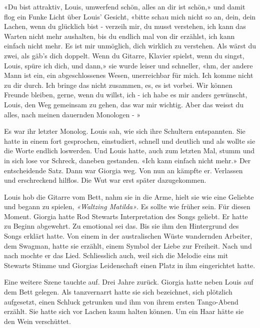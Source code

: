 «Du bist attraktiv, Louis, umwerfend schön, alles an dir ist schön,» und damit flog ein Funke Licht über Louis’ Gesicht, «bitte schau mich nicht so an, dein, dein Lachen, wenn du glücklich bist - verzeih mir, du musst verstehen, ich kann das Warten nicht mehr aushalten, bis du endlich mal von dir erzählst, ich kann einfach nicht mehr. Es ist mir unmöglich, dich wirklich zu verstehen. Als wärst du zwei, als gäb’s dich doppelt. Wenn du Gitarre, Klavier spielst, wenn du singst, Louis, spüre ich dich, und dann,» sie wurde leiser und schneller, «hm, der andere Mann ist ein, ein abgeschlossenes Wesen, unerreichbar für mich. Ich komme nicht zu dir durch. Ich bringe das nicht zusammen, es, es ist vorbei. Wir können Freunde bleiben, gerne, wenn du willst, ich - ich habe es mir anders gewünscht, Louis, den Weg gemeinsam zu gehen, das war mir wichtig. Aber das weisst du alles, nach meinen dauernden Monologen - »

Es war ihr letzter Monolog. Louis sah, wie sich ihre Schultern entspannten. Sie hatte in einem fort gesprochen, einstudiert, schnell und deutlich und als wollte sie die Worte endlich loswerden. Und Louis hatte, auch zum letzten Mal, stumm und in sich lose vor Schreck, daneben gestanden.
«Ich kann einfach nicht mehr.»
Der entscheidende Satz. Dann war Giorgia weg.
Von nun an kämpfte er. Verlassen und erschreckend hilflos. 
Die Wut war erst später dazugekommen.

\sectionbreak

Louis hob die Gitarre vom Bett, nahm sie in die Arme, hielt sie wie eine Geliebte und begann zu spielen, \emph{«Waltzing Matilda»}.
Es sollte wie früher sein. Für diesen Moment. Giorgia hatte Rod Stewarts Interpretation des Songs geliebt. Er hatte zu Beginn abgewehrt. Zu emotional sei das. Bis sie ihm den Hintergrund des Songs erklärt hatte. Von einem in der australischen Wüste wandernden Arbeiter, dem Swagman, hatte sie erzählt, einem Symbol der Liebe zur Freiheit. Nach und nach mochte er das Lied. Schliesslich auch, weil sich die Melodie eins mit Stewarts Stimme und Giorgias Leidenschaft  einen Platz in ihm eingerichtet hatte.


Eine weitere Szene tauchte auf. Drei Jahre zurück. Giorgia hatte neben Louis auf dem Bett gelegen. Als tanzvernarrt hatte sie sich bezeichnet, sich plötzlich aufgesetzt, einen Schluck getrunken und ihm von ihrem ersten Tango-Abend erzählt. Sie hatte sich vor Lachen kaum halten können. Um ein Haar hätte sie den Wein verschüttet.

